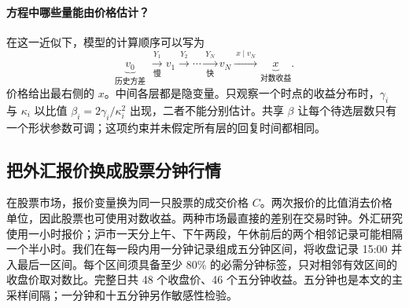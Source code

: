 \documentclass[11pt,a4paper]{article}
\begin{document}
\paragraph{方程中哪些量能由价格估计？}
在这一近似下，模型的计算顺序可以写为
\[
 \underbrace{v_0}_{\text{历史方差}}\;
 \xrightarrow[\text{慢}]{\,Y_1\,}v_1
 \xrightarrow{\,Y_2\,}\cdots
 \xrightarrow[\text{快}]{\,Y_N\,}v_N
 \xrightarrow{\ x\mid v_N\ }\underbrace{x}_{\text{对数收益}} .
\]
价格给出最右侧的 $x$。中间各层都是隐变量。只观察一个时点的收益分布时，$\gamma_i$ 与 $\kappa_i$ 以比值 $\beta_i=2\gamma_i/\kappa_i^2$ 出现，二者不能分别估计。共享 $\beta$ 让每个待选层数只有一个形状参数可调；这项约束并未假定所有层的回复时间都相同。

\clearpage
\subsection{把外汇报价换成股票分钟行情}\label{sec:data}
在股票市场，报价变量换为同一只股票的成交价格 $C$。两次报价的比值消去价格单位，因此股票也可使用对数收益。两种市场最直接的差别在交易时钟。外汇研究使用一小时报价；沪市一天分上午、下午两段，午休前后的两个相邻记录可能相隔一个半小时。我们在每一段内用一分钟记录组成五分钟区间，将收盘记录 15:00 并入最后一区间。每个区间须具备至少 80\% 的必需分钟标签，只对相邻有效区间的收盘价取对数比。完整日共 48 个收盘价、46 个五分钟收益。五分钟也是本文的主采样间隔；一分钟和十五分钟另作敏感性检验。
\end{document}
